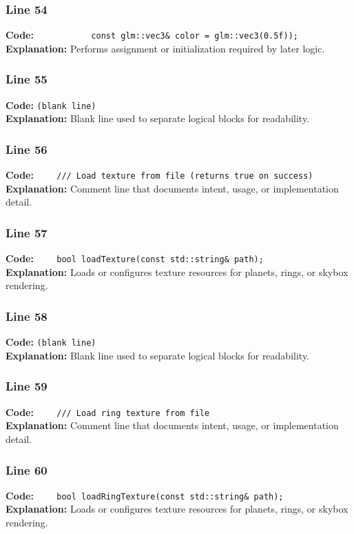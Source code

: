 \documentclass[11pt,a4paper]{article}
\begin{document}
\subsubsection*{Line 54}
\textbf{Code:} \verb|           const glm::vec3& color = glm::vec3(0.5f));|\\
\textbf{Explanation:} Performs assignment or initialization required by later logic.

\subsubsection*{Line 55}
\textbf{Code:} \texttt{(blank line)}\\
\textbf{Explanation:} Blank line used to separate logical blocks for readability.

\subsubsection*{Line 56}
\textbf{Code:} \verb|    /// Load texture from file (returns true on success)|\\
\textbf{Explanation:} Comment line that documents intent, usage, or implementation detail.

\subsubsection*{Line 57}
\textbf{Code:} \verb|    bool loadTexture(const std::string& path);|\\
\textbf{Explanation:} Loads or configures texture resources for planets, rings, or skybox rendering.

\subsubsection*{Line 58}
\textbf{Code:} \texttt{(blank line)}\\
\textbf{Explanation:} Blank line used to separate logical blocks for readability.

\subsubsection*{Line 59}
\textbf{Code:} \verb|    /// Load ring texture from file|\\
\textbf{Explanation:} Comment line that documents intent, usage, or implementation detail.

\subsubsection*{Line 60}
\textbf{Code:} \verb|    bool loadRingTexture(const std::string& path);|\\
\textbf{Explanation:} Loads or configures texture resources for planets, rings, or skybox rendering.
\end{document}

